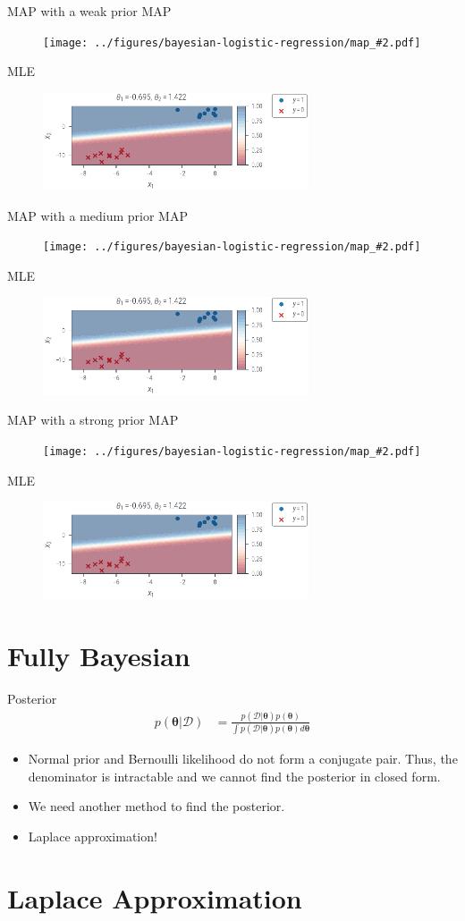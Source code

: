 \documentclass{beamer}
\newcommand{\data}{\mathcal{D}}
\begin{document}
\newcommand{\MapVsMle}[2]{
    \begin{frame}{#1}
        MAP
        \begin{figure}
            \texttt{[image: ../figures/bayesian-logistic-regression/map\_\#2.pdf]}
        \end{figure}
        MLE
        \begin{figure}
            \includegraphics[width=0.7\textwidth]{../figures/bayesian-logistic-regression/mle.pdf}
        \end{figure}
    \end{frame}
}

\MapVsMle{MAP with a weak prior}{100.0}
\MapVsMle{MAP with a medium prior}{1.0}
\MapVsMle{MAP with a strong prior}{0.1}

\section{Fully Bayesian}

\begin{frame}{Posterior}
    \begin{align*}
        p(\boldsymbol{\theta} | \data) & = \frac{p(\data | \boldsymbol{\theta}) p(\boldsymbol{\theta})}{\int p(\data | \boldsymbol{\theta}) p(\boldsymbol{\theta}) d\boldsymbol{\theta}}
    \end{align*}
    \begin{itemize}
        \item Normal prior and Bernoulli likelihood do not form a conjugate pair. Thus, the denominator is intractable and we cannot find the posterior in closed form.
              \pause
        \item We need another method to find the posterior.
              \pause
        \item Laplace approximation!
    \end{itemize}
\end{frame}

\section{Laplace Approximation}
\end{document}
